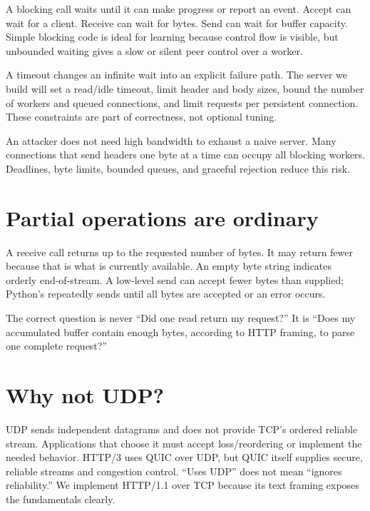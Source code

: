 A blocking call waits until it can make progress or report an event. Accept can
wait for a client. Receive can wait for bytes. Send can wait for buffer capacity.
Simple blocking code is ideal for learning because control flow is visible, but
unbounded waiting gives a slow or silent peer control over a worker.

A timeout changes an infinite wait into an explicit failure path. The server we
build will set a read/idle timeout, limit header and body sizes, bound the number
of workers and queued connections, and limit requests per persistent connection.
These constraints are part of correctness, not optional tuning.

\begin{securityboundary}
An attacker does not need high bandwidth to exhaust a naive server. Many
connections that send headers one byte at a time can occupy all blocking workers.
Deadlines, byte limits, bounded queues, and graceful rejection reduce this risk.
\end{securityboundary}

\section{Partial operations are ordinary}

A receive call returns up to the requested number of bytes. It may return fewer
because that is what is currently available. An empty byte string indicates
orderly end-of-stream. A low-level send can accept fewer bytes than supplied;
Python's  repeatedly sends until all bytes are accepted or an error
occurs.

The correct question is never ``Did one read return my request?'' It is ``Does
my accumulated buffer contain enough bytes, according to HTTP framing, to parse
one complete request?''

\section{Why not UDP?}

UDP sends independent datagrams and does not provide TCP's ordered reliable
stream. Applications that choose it must accept loss/reordering or implement
the needed behavior. HTTP/3 uses QUIC over UDP, but QUIC itself supplies secure,
reliable streams and congestion control. ``Uses UDP'' does not mean ``ignores
reliability.'' We implement HTTP/1.1 over TCP because its text framing exposes
the fundamentals clearly.

